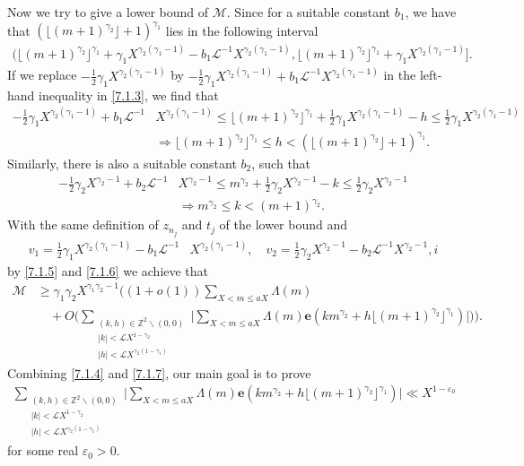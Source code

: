\documentclass[12pt, reqno, twoside, letterpaper]{amsart}
\numberwithin{equation}{section}
\newcommand{\e}{\ensuremath{\mathbf{e}}}
\newcommand{\cL}{\ensuremath{\mathcal{L}}}
\newcommand{\cM}{\ensuremath{\mathcal{M}}}
\newcommand{\ZZ}{\ensuremath{\mathbb{Z}}}
\theoremstyle{customthm}
\theoremstyle{customrem}
\begin{document}
Now we try to give a lower bound of $\cM$. Since for a suitable constant $b_1$, we have that $ (\lfloor (m+1)^{\gamma_2}\rfloor+1)^{\gamma_1} $ lies in the following interval
\begin{align*}
\bigg(\lfloor (m+1)^{\gamma_2}\rfloor^{\gamma_1} + \gamma_1X^{\gamma_2(\gamma_1-1)} - b_1\cL^{-1}X^{\gamma_2(\gamma_1-1)},\lfloor (m+1)^{\gamma_2}\rfloor^{\gamma_1} + \gamma_1X^{\gamma_2(\gamma_1-1)}\bigg].
\end{align*}
If we replace $-\frac{1}{2}\gamma_1 X^{\gamma_2(\gamma_1-1)}$ by $-\frac{1}{2}\gamma_1 X^{\gamma_2(\gamma_1-1)} + b_1\cL^{-1}X^{\gamma_2(\gamma_1-1)}$ in the left-hand inequality in \eqref{7.1.3}, we find that
\begin{align}
	\label{7.1.5}
\nonumber -\frac{1}{2}\gamma_1 X^{\gamma_2(\gamma_1-1)} + b_1\cL^{-1}&X^{\gamma_2(\gamma_1-1)} \leqslant\lfloor (m+1)^{\gamma_2}\rfloor^{\gamma_1}+\frac{1}{2}\gamma_1 X^{\gamma_2(\gamma_1-1)} -h \leqslant\frac{1}{2}\gamma_1 X^{\gamma_2(\gamma_1-1)} \\
&\Rightarrow \lfloor (m+1)^{\gamma_2}\rfloor^{\gamma_1} \leqslant h < (\lfloor (m+1)^{\gamma_2}\rfloor+1)^{\gamma_1}.
\end{align}
Similarly, there is also a suitable constant $b_2$, such that
\begin{align}
	\label{7.1.6}
\nonumber -\frac{1}{2}\gamma_2 X^{\gamma_2-1} + b_2\cL^{-1}&X^{\gamma_2-1} \leqslant m^{\gamma_2}+\frac{1}{2}\gamma_2 X^{\gamma_2-1} -k \leqslant \frac{1}{2}\gamma_2 X^{\gamma_2-1}\\
&\Rightarrow m^{\gamma_2} \leqslant k < (m+1)^{\gamma_2}.
\end{align}
With the same definition of $z_{n_j}$ and $t_j$ of the lower bound and
\begin{align*}
v_1 = \frac{1}{2}\gamma_1 X^{\gamma_2(\gamma_1-1)} - b_1\cL^{-1}&X^{\gamma_2(\gamma_1-1)}, \quad v_2 = \frac{1}{2}\gamma_2 X^{\gamma_2-1} - b_2\cL^{-1}X^{\gamma_2-1},i
\end{align*}
by \eqref{7.1.5} and \eqref{7.1.6} we achieve that
\begin{align}
\label{7.1.7}
\cM &\geqslant \gamma_1\gamma_2 X^{\gamma_1\gamma_2-1} \bigg( (1+o(1)) \sum_{X < m \leqslant aX}\Lambda(m) \nonumber \\
&\quad+O\Big( \sum_{\substack{(k,h) \in \ZZ^2 \backslash (0,0) \\ |k|<\cL X^{1-\gamma_2} \\ |h|<\cL X^{\gamma_2(1-\gamma_1)}}} \Big| \sum_{X < m \leqslant aX} \Lambda(m) \e (km^{\gamma_2} + h\lfloor(m+1)^{\gamma_2}\rfloor^{\gamma_1}) \Big| \Big) \bigg).
\end{align}
Combining \eqref{7.1.4} and \eqref{7.1.7}, our main goal is to prove
\begin{align}\label{eq: main goal in intersection ps}
\sum_{\substack{(k,h) \in \ZZ^2 \backslash (0,0) \\ |k|<\cL X^{1-\gamma_2} \\ |h|<\cL X^{\gamma_2(1-\gamma_1)}}} \Big| \sum_{X < m \leqslant aX} \Lambda(m) \e (km^{\gamma_2} + h\lfloor(m+1)^{\gamma_2}\rfloor^{\gamma_1})\Big|\ll X^{1-\varepsilon_0}
\end{align}
for some real $\varepsilon_0>0$.
\end{document}
